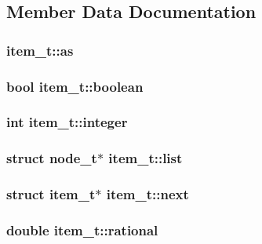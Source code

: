 \subsection{Member Data Documentation}
\hypertarget{structitem__t_ae02efe7177a2e249ed330b4d13de080e}{
\subsubsection[{as}]{ item\-\_\-t\-::as}}\label{structitem__t_ae02efe7177a2e249ed330b4d13de080e}
\hypertarget{structitem__t_ac0addaea95e0b9dfae753a47d13d2587}{
\subsubsection[{boolean}]{\setlength{\rightskip}{0pt plus 5cm}bool item\-\_\-t\-::boolean}}\label{structitem__t_ac0addaea95e0b9dfae753a47d13d2587}
\hypertarget{structitem__t_a2dfca9e3bbcf3387dccd22d5bad14b84}{
\subsubsection[{integer}]{\setlength{\rightskip}{0pt plus 5cm}int item\-\_\-t\-::integer}}\label{structitem__t_a2dfca9e3bbcf3387dccd22d5bad14b84}
\hypertarget{structitem__t_ac34a390f30f67b66038f5380184b03ea}{
\subsubsection[{list}]{\setlength{\rightskip}{0pt plus 5cm}struct {\bf node\-\_\-t}$\ast$ item\-\_\-t\-::list}}\label{structitem__t_ac34a390f30f67b66038f5380184b03ea}
\hypertarget{structitem__t_aeb875e56e95afe07d0f400f84e0eaef6}{
\subsubsection[{next}]{\setlength{\rightskip}{0pt plus 5cm}struct {\bf item\-\_\-t}$\ast$ item\-\_\-t\-::next}}\label{structitem__t_aeb875e56e95afe07d0f400f84e0eaef6}
\hypertarget{structitem__t_ae553bd8a6e792f97324908694a7ff601}{
\subsubsection[{rational}]{\setlength{\rightskip}{0pt plus 5cm}double item\-\_\-t\-::rational}}\label{structitem__t_ae553bd8a6e792f97324908694a7ff601}
